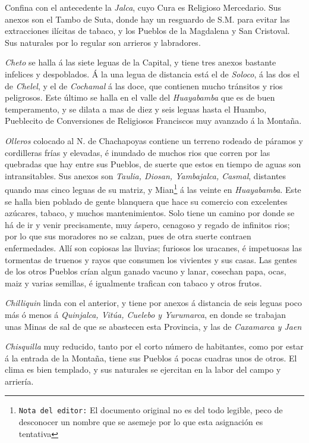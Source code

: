 \documentclass[12pt,a4paper]{article}
\begin{document}
Confina con el antecedente la \emph{Jalca}, cuyo Cura es Religioso Mercedario. Sus anexos son el Tambo de Suta, donde hay un resguardo de S.M. para evitar las extracciones ilícitas de tabaco, y los Pueblos de la Magdalena y San Cristoval. Sus naturales por lo regular son arrieros y labradores.

\emph{Cheto} se halla á las siete leguas de la Capital, y tiene tres anexos bastante infelices y despoblados. Á la una legua de distancia está el de \emph{Soloco}, á las dos el de \emph{Chelel}, y el de \emph{Cochamal} á las doce, que contienen mucho tránsitos y rios peligrosos. Este último se halla en el valle del \emph{Huayabamba} que es de buen temperamento, y se dilata a mas de diez y seis leguas hasta el Huambo, Pueblecito de Conversiones de Religiosos Franciscos muy avanzado á la Montaña.

\emph{Olleros} colocado al N. de Chachapoyas contiene un terreno rodeado de páramos y cordilleras frías y elevadas, é inundado de muchos rios que corren por las quebradas que hay entre sus Pueblos, de suerte que estos en tiempo de aguas son intransitables. Sus anexos son \emph{Taulia, Diosan, Yambajalca, Casmal}, distantes quando mas cinco leguas de su matriz, y Mian\footnote{\texttt{Nota del editor:} El documento original no es del todo legible, peco de desconocer un nombre que se asemeje por lo que esta asignación es tentativa} á las veinte en \emph{Huayabamba}. Este se halla bien poblado de gente blanquera que hace su comercio con excelentes azúcares, tabaco, y muchos mantenimientos. Solo tiene un camino por donde se há de ir y venir precisamente, muy áspero, cenagoso y regado de infinitos rios; por lo que sus moradores no se calzan, pues de otra suerte contraen enfermedades. Allí son copiosas las lluvias; furiosos los uracanes, é impetuosas las tormentas de truenos y rayos que consumen los vivientes y sus casas. Las gentes de los otros Pueblos crían algun ganado vacuno y lanar, cosechan papa, ocas, maiz y varias semillas, é igualmente trafican con tabaco y otros frutos.

\emph{Chilliquin} linda con el anterior, y tiene por anexos á distancia de seis leguas poco más ó menos á \emph{Quinjalca, Vitúa, Cuelebo y Yurumarca}, en donde se trabajan unas Minas de sal de que se abastecen esta Provincia, y las de \emph{Caxamarca y Jaen}

\emph{Chisquilla} muy reducido, tanto por el corto número de habitantes, como por estar á la entrada de la Montaña, tiene sus Pueblos á pocas cuadras unos de otros. El clima es bien templado, y sus naturales se ejercitan en la labor del campo y arriería. 
\end{document}
